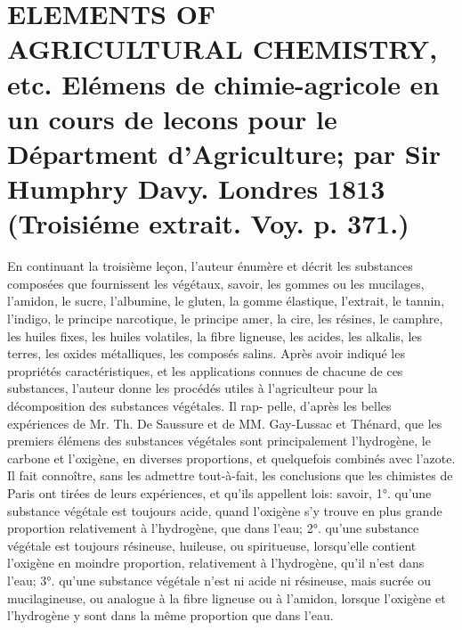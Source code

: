 \setcounter{page}{411}
\section{ELEMENTS OF AGRICULTURAL CHEMISTRY, etc. Elémens de chimie-agricole en un cours de lecons pour le Départment d'Agriculture; par Sir Humphry Davy. Londres 1813 \large{(Troisiéme extrait. Voy. p. 371.)}}
En continuant la troisième leçon, l'auteur énumère et décrit les substances composées que fournissent les végétaux, savoir, les gommes ou les mucilages, l'amidon, le sucre, l'albumine, le gluten, la gomme élastique, l'extrait, le tannin, l'indigo, le principe narcotique, le principe amer, la cire, les résines, le camphre, les huiles fixes, les huiles volatiles, la fibre ligneuse, les acides, les alkalis, les terres, les oxides métalliques, les composés salins.
Après avoir indiqué les propriétés caractéristiques, et les applications connues de chacune de ces substances, l'auteur donne les procédés utiles à l'agriculteur pour la décomposition des substances végétales. Il rap-\setcounter{page}{412} pelle, d'après les belles expériences de Mr. Th. De Saussure et de MM. Gay-Lussac et Thénard, que les premiers élémens des substances végétales sont principalement l'hydrogène, le carbone et l'oxigène, en diverses proportions, et quelquefois combinés avec l'azote. Il fait connoître, sans les admettre tout-à-fait, les conclusions que les chimistes de Paris ont tirées de leurs expériences, et qu'ils appellent lois: savoir, 1°. qu'une substance végétale est toujours acide, quand l'oxigène s'y trouve en plus grande proportion relativement à l'hydrogène, que dans l'eau; 2°. qu'une substance végétale est toujours résineuse, huileuse, ou spiritueuse, lorsqu'elle contient l'oxigène en moindre proportion, relativement à l'hydrogène, qu'il n'est dans l'eau; 3°. qu'une substance végétale n'est ni acide ni résineuse, mais sucrée ou mucilagineuse, ou analogue à la fibre ligneuse ou à l'amidon, lorsque l'oxigène et l'hydrogène y sont dans la même proportion que dans l'eau.

